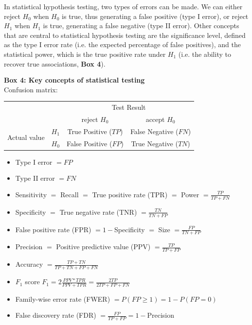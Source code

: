In statistical hypothesis testing, two types of errors can be made. 
We can either reject $H_0$ when $H_0$ is true, thus generating a false positive (type I error), or reject $H_1$ when $H_1$ is true, generating a false negative (type II error).
Other concepts that are central to statistical hypothesis testing are the significance level, defined as the type I error rate (i.e. the expected percentage of false positives), and the statistical power, which is the true positive rate under $H_1$ (i.e. the ability to recover true associations, \textbf{Box 4}).


\newpage

\begin{Comment}
\hspace{-2.5mm}\textbf{Box 4: Key concepts of statistical testing}\label{box4}\\
Confusion matrix:

\begin{center}
\begin{tabular}{l|l|c|c|}
\multicolumn{2}{c}{}&\multicolumn{2}{c}{Test Result}\\
\cline{3-4}
\multicolumn{2}{c|}{}&reject $H_0$&accept $H_0$\\
\cline{2-4}
\multirow{2}{*}{Actual value}& $H_1$ & True Positive ($TP$) & False Negative ($FN$)\\
\cline{2-4}
& $H_0$ & False Positive ($FP$) & True Negative ($TN$)\\
\cline{2-4}
\end{tabular}
\end{center}

\begin{itemize}
    \item Type I error $= FP$
    \item Type II error $= FN$
    \item Sensitivity $=$ Recall $=$ True positive rate (TPR) $=$ Power $=\frac{TP}{TP+FN}$
    \item Specificity $=$ True negative rate (TNR) $=\frac{TN}{TN+FP}$
    \item False positive rate (FPR) $= 1-$Specificity $=$ Size $=\frac{FP}{TN+FP}$
    \item Precision $=$ Positive predictive value (PPV) $=\frac{TP}{TP+FP}$
    \item Accuracy $=\frac{TP+TN}{TP+TN+FP+FN}$
    \item $F_1$ score $F_1=2 \frac{PPV*TPR}{PPV+TPR}=\frac{2TP}{2TP+FP+FN}$
    \item Family-wise error rate (FWER) $=P(FP \geq 1)= 1 - P(FP=0)$
    \item False discovery rate (FDR) $=\frac{FP}{TP+FP}= 1- $Precision
\end{itemize}

\vfill

\end{Comment}

